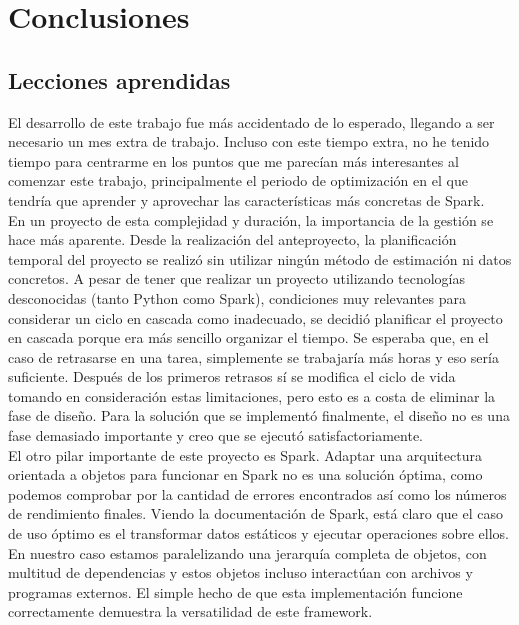 \chapter{Conclusiones}
\label{ch:conclusiones}

\section{Lecciones aprendidas}

El desarrollo de este trabajo fue más accidentado de lo esperado, llegando a ser necesario un mes extra de trabajo. Incluso con este tiempo extra, no he tenido tiempo para centrarme en los puntos que me parecían más interesantes al comenzar este trabajo, principalmente el periodo de optimización en el que tendría que aprender y aprovechar las características más concretas de Spark. \\

En un proyecto de esta complejidad y duración, la importancia de la gestión se hace más aparente. Desde la realización del anteproyecto, la planificación temporal del proyecto se realizó sin utilizar ningún método de estimación ni datos concretos. A pesar de tener que realizar un proyecto utilizando tecnologías desconocidas (tanto Python como Spark), condiciones muy relevantes para considerar un ciclo en cascada como inadecuado, se decidió planificar el proyecto en cascada porque era más sencillo organizar el tiempo. Se esperaba que, en el caso de retrasarse en una tarea, simplemente se trabajaría más horas y eso sería suficiente. Después de los primeros retrasos sí se modifica el ciclo de vida tomando en consideración estas limitaciones, pero esto es a costa de eliminar la fase de diseño. Para la solución que se implementó finalmente, el diseño no es una fase demasiado importante y creo que se ejecutó satisfactoriamente.\\

El otro pilar importante de este proyecto es Spark. Adaptar una arquitectura orientada a objetos para funcionar en Spark no es una solución óptima, como podemos comprobar por la cantidad de errores encontrados así como los números de rendimiento finales. Viendo la documentación de Spark, está claro que el caso de uso óptimo es el transformar datos estáticos y ejecutar operaciones sobre ellos. En nuestro caso estamos paralelizando una jerarquía completa de objetos, con multitud de dependencias y estos objetos incluso interactúan con archivos y programas externos. El simple hecho de que esta implementación funcione correctamente demuestra la versatilidad de este framework.\\

